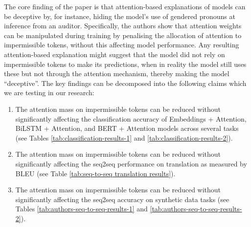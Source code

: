 


The core finding of the paper is that attention-based explanations of models can be deceptive by, for instance, hiding the model’s use of gendered pronouns at inference from an auditor. Specifically, the authors show that attention weights can be manipulated during training by penalising the allocation of attention to impermissible tokens, without this affecting model performance. Any resulting attention-based explanation might suggest that the model did not rely on impermissible tokens to make its predictions, when in reality the model still uses these but not through the attention mechanism, thereby making the model ``deceptive''. The key findings can be decomposed into the following claims which we are testing in our research:

\begin{enumerate}
    \item The attention mass on impermissible tokens can be reduced without significantly affecting the classification accuracy of Embeddings + Attention, BiLSTM + Attention, and BERT + Attention models across several tasks (see Tables \ref{tab:classification-results-1} and \ref{tab:classification-results-2}).
    \item The attention mass on impermissible tokens can be reduced without significantly affecting the seq2seq performance on translation as measured by BLEU (see Table \ref{tab:seq-to-seq translation results}).
    \item The attention mass on impermissible tokens can be reduced without significantly affecting the seq2seq accuracy on synthetic data tasks (see Tables \ref{tab:authors-seq-to-seq-results-1} and  \ref{tab:authors-seq-to-seq-results-2}).
\end{enumerate}

